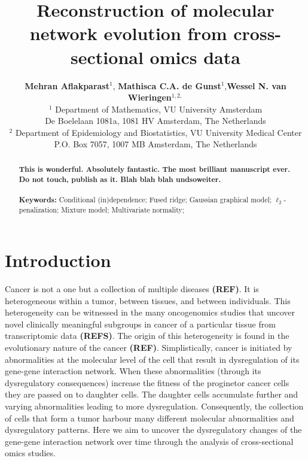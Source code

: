 \documentclass[10pt]{article}
\title{Reconstruction of molecular network evolution from cross-sectional omics data}
\author{ {\small
\textbf{Mehran Aflakparast}$^{1}$, \textbf{Mathisca C.A. de Gunst}$^{1}$,\textbf{Wessel N. van Wieringen}$^{1,2,}$%
}
\\
{\small $^1$ Department of Mathematics, VU University Amsterdam}
\\
{\small De Boelelaan 1081a, 1081 HV Amsterdam, The Netherlands}
\\
{\small $^2$ Department of Epidemiology and Biostatistics, VU University Medical Center}
\\
{\small P.O. Box 7057, 1007 MB Amsterdam, The Netherlands}
}
\date{}
\begin{document}
\maketitle


\begin{abstract}
\noindent
\textbf{This is wonderful. Absolutely fantastic. The most brilliant manuscript ever. Do not touch, publish as it. Blah blah blah undsoweiter.}
\\
\\
{\bf Keywords:}  Conditional (in)dependence; Fused ridge; Gaussian graphical model; $\ell_2$-penalization; Mixture model; Multivariate normality;
\end{abstract}




\section{Introduction}
Cancer is not a one but a collection of multiple diseases \textbf{(REF)}. It is heterogeneous within a tumor, between tissues, and between individuals. This heterogeneity can be witnessed in the many oncogenomics studies that uncover novel clinically meaningful subgroups in cancer of a particular tissue from transcriptomic data \textbf{(REFS)}. The origin of this heterogeneity is found in the evolutionary nature of the cancer \textbf{(REF)}. Simplistically, cancer is initiated by abnormalities at the molecular level of the cell that result in dysregulation of its gene-gene interaction network. When these abnormalities (through its dysregulatory consequences) increase the fitness of the proginetor cancer cells they are passed on to daughter cells. The daughter cells accumulate further and varying abnormalities leading to more dysregulation. Consequently, the collection of cells that form a tumor harbour many different molecular abnormalities and dysregulatory patterns. Here we aim to uncover the dysregulatory changes of the gene-gene interaction network over time through the analysis of cross-sectional omics studies.
\end{document}

